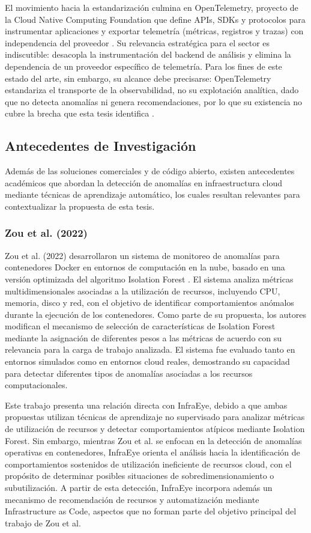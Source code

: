 El movimiento hacia la estandarización culmina en OpenTelemetry, proyecto de la Cloud Native Computing Foundation que define APIs, SDKs y protocolos para instrumentar aplicaciones y exportar telemetría (métricas, registros y trazas) con independencia del proveedor \parencite{OpenTelemetry2026}. Su relevancia estratégica para el sector es indiscutible: desacopla la instrumentación del backend de análisis y elimina la dependencia de un proveedor específico de telemetría. Para los fines de este estado del arte, sin embargo, su alcance debe precisarse: OpenTelemetry estandariza el transporte de la observabilidad, no su explotación analítica, dado que no detecta anomalías ni genera recomendaciones, por lo que su existencia no cubre la brecha que esta tesis identifica \parencite{OpenTelemetry2026}.

\subsection{Antecedentes de Investigación}

Además de las soluciones comerciales y de código abierto, existen antecedentes académicos que abordan la detección de anomalías en infraestructura cloud mediante técnicas de aprendizaje automático, los cuales resultan relevantes para contextualizar la propuesta de esta tesis.

\subsubsection{Zou et al. (2022)}

Zou et al. (2022) desarrollaron un sistema de monitoreo de anomalías para contenedores Docker en entornos de computación en la nube, basado en una versión optimizada del algoritmo Isolation Forest \parencite{Zou2022}. El sistema analiza métricas multidimensionales asociadas a la utilización de recursos, incluyendo CPU, memoria, disco y red, con el objetivo de identificar comportamientos anómalos durante la ejecución de los contenedores. Como parte de su propuesta, los autores modifican el mecanismo de selección de características de Isolation Forest mediante la asignación de diferentes pesos a las métricas de acuerdo con su relevancia para la carga de trabajo analizada. El sistema fue evaluado tanto en entornos simulados como en entornos cloud reales, demostrando su capacidad para detectar diferentes tipos de anomalías asociadas a los recursos computacionales.

Este trabajo presenta una relación directa con InfraEye, debido a que ambas propuestas utilizan técnicas de aprendizaje no supervisado para analizar métricas de utilización de recursos y detectar comportamientos atípicos mediante Isolation Forest. Sin embargo, mientras Zou et al. se enfocan en la detección de anomalías operativas en contenedores, InfraEye orienta el análisis hacia la identificación de comportamientos sostenidos de utilización ineficiente de recursos cloud, con el propósito de determinar posibles situaciones de sobredimensionamiento o subutilización. A partir de esta detección, InfraEye incorpora además un mecanismo de recomendación de recursos y automatización mediante Infrastructure as Code, aspectos que no forman parte del objetivo principal del trabajo de Zou et al.

